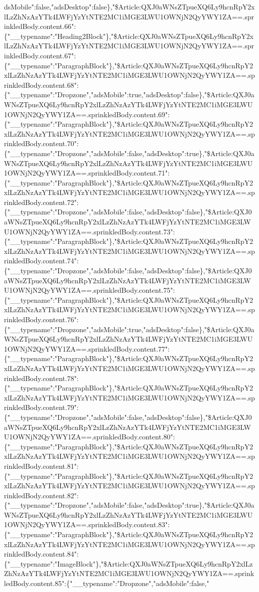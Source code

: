 dsMobile":false,"adsDesktop":false\},"\$Article:QXJ0aWNsZTpueXQ6Ly9hcnRpY2xlLzZhNzAzYTk4LWFjYzYtNTE2MC1iMGE3LWU1OWNjN2QyYWY1ZA==.sprinkledBody.content.66":\{"\_\_typename":"Heading2Block"\},"\$Article:QXJ0aWNsZTpueXQ6Ly9hcnRpY2xlLzZhNzAzYTk4LWFjYzYtNTE2MC1iMGE3LWU1OWNjN2QyYWY1ZA==.sprinkledBody.content.67":\{"\_\_typename":"ParagraphBlock"\},"\$Article:QXJ0aWNsZTpueXQ6Ly9hcnRpY2xlLzZhNzAzYTk4LWFjYzYtNTE2MC1iMGE3LWU1OWNjN2QyYWY1ZA==.sprinkledBody.content.68":\{"\_\_typename":"Dropzone","adsMobile":true,"adsDesktop":false\},"\$Article:QXJ0aWNsZTpueXQ6Ly9hcnRpY2xlLzZhNzAzYTk4LWFjYzYtNTE2MC1iMGE3LWU1OWNjN2QyYWY1ZA==.sprinkledBody.content.69":\{"\_\_typename":"ParagraphBlock"\},"\$Article:QXJ0aWNsZTpueXQ6Ly9hcnRpY2xlLzZhNzAzYTk4LWFjYzYtNTE2MC1iMGE3LWU1OWNjN2QyYWY1ZA==.sprinkledBody.content.70":\{"\_\_typename":"Dropzone","adsMobile":false,"adsDesktop":true\},"\$Article:QXJ0aWNsZTpueXQ6Ly9hcnRpY2xlLzZhNzAzYTk4LWFjYzYtNTE2MC1iMGE3LWU1OWNjN2QyYWY1ZA==.sprinkledBody.content.71":\{"\_\_typename":"ParagraphBlock"\},"\$Article:QXJ0aWNsZTpueXQ6Ly9hcnRpY2xlLzZhNzAzYTk4LWFjYzYtNTE2MC1iMGE3LWU1OWNjN2QyYWY1ZA==.sprinkledBody.content.72":\{"\_\_typename":"Dropzone","adsMobile":false,"adsDesktop":false\},"\$Article:QXJ0aWNsZTpueXQ6Ly9hcnRpY2xlLzZhNzAzYTk4LWFjYzYtNTE2MC1iMGE3LWU1OWNjN2QyYWY1ZA==.sprinkledBody.content.73":\{"\_\_typename":"ParagraphBlock"\},"\$Article:QXJ0aWNsZTpueXQ6Ly9hcnRpY2xlLzZhNzAzYTk4LWFjYzYtNTE2MC1iMGE3LWU1OWNjN2QyYWY1ZA==.sprinkledBody.content.74":\{"\_\_typename":"Dropzone","adsMobile":false,"adsDesktop":false\},"\$Article:QXJ0aWNsZTpueXQ6Ly9hcnRpY2xlLzZhNzAzYTk4LWFjYzYtNTE2MC1iMGE3LWU1OWNjN2QyYWY1ZA==.sprinkledBody.content.75":\{"\_\_typename":"ParagraphBlock"\},"\$Article:QXJ0aWNsZTpueXQ6Ly9hcnRpY2xlLzZhNzAzYTk4LWFjYzYtNTE2MC1iMGE3LWU1OWNjN2QyYWY1ZA==.sprinkledBody.content.76":\{"\_\_typename":"Dropzone","adsMobile":true,"adsDesktop":false\},"\$Article:QXJ0aWNsZTpueXQ6Ly9hcnRpY2xlLzZhNzAzYTk4LWFjYzYtNTE2MC1iMGE3LWU1OWNjN2QyYWY1ZA==.sprinkledBody.content.77":\{"\_\_typename":"ParagraphBlock"\},"\$Article:QXJ0aWNsZTpueXQ6Ly9hcnRpY2xlLzZhNzAzYTk4LWFjYzYtNTE2MC1iMGE3LWU1OWNjN2QyYWY1ZA==.sprinkledBody.content.78":\{"\_\_typename":"ParagraphBlock"\},"\$Article:QXJ0aWNsZTpueXQ6Ly9hcnRpY2xlLzZhNzAzYTk4LWFjYzYtNTE2MC1iMGE3LWU1OWNjN2QyYWY1ZA==.sprinkledBody.content.79":\{"\_\_typename":"Dropzone","adsMobile":false,"adsDesktop":false\},"\$Article:QXJ0aWNsZTpueXQ6Ly9hcnRpY2xlLzZhNzAzYTk4LWFjYzYtNTE2MC1iMGE3LWU1OWNjN2QyYWY1ZA==.sprinkledBody.content.80":\{"\_\_typename":"ParagraphBlock"\},"\$Article:QXJ0aWNsZTpueXQ6Ly9hcnRpY2xlLzZhNzAzYTk4LWFjYzYtNTE2MC1iMGE3LWU1OWNjN2QyYWY1ZA==.sprinkledBody.content.81":\{"\_\_typename":"ParagraphBlock"\},"\$Article:QXJ0aWNsZTpueXQ6Ly9hcnRpY2xlLzZhNzAzYTk4LWFjYzYtNTE2MC1iMGE3LWU1OWNjN2QyYWY1ZA==.sprinkledBody.content.82":\{"\_\_typename":"Dropzone","adsMobile":false,"adsDesktop":true\},"\$Article:QXJ0aWNsZTpueXQ6Ly9hcnRpY2xlLzZhNzAzYTk4LWFjYzYtNTE2MC1iMGE3LWU1OWNjN2QyYWY1ZA==.sprinkledBody.content.83":\{"\_\_typename":"ParagraphBlock"\},"\$Article:QXJ0aWNsZTpueXQ6Ly9hcnRpY2xlLzZhNzAzYTk4LWFjYzYtNTE2MC1iMGE3LWU1OWNjN2QyYWY1ZA==.sprinkledBody.content.84":\{"\_\_typename":"ImageBlock"\},"\$Article:QXJ0aWNsZTpueXQ6Ly9hcnRpY2xlLzZhNzAzYTk4LWFjYzYtNTE2MC1iMGE3LWU1OWNjN2QyYWY1ZA==.sprinkledBody.content.85":\{"\_\_typename":"Dropzone","adsMobile":false,"